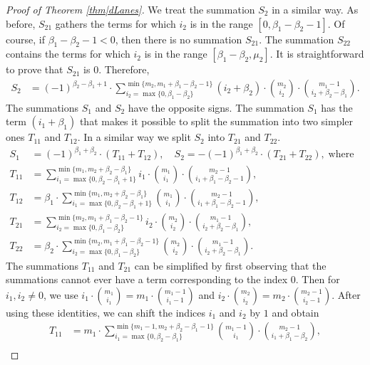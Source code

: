\documentclass[reqno]{amsart}
\begin{document}
\begin{appendix}
\begin{proof}[Proof of Theorem \ref{thm|dLanes}]
We treat the summation $S_2$ in a similar way. As before, $S_{21}$ gathers the terms for which $i_2$ is in the range $[0, \beta_1-\beta_2-1]$. Of course, if $\beta_1-\beta_2-1<0$, then there is no summation $S_{21}$. The summation $S_{22}$ contains the terms for which $i_2$ is in the range $[\beta_1-\beta_2,\mu_2]$. It is straightforward to prove that $S_{21}$ is $0$. Therefore,  
\begin{align}S_2&=(-1)^{\beta_2-\beta_1+1}\cdot\sum_{i_2=\max\{0,\beta_1-\beta_2\}}^{\min\{m_2,m_1+\beta_1-\beta_2-1\}}  (i_2+\beta_2)\cdot 
\binom{m_2}{i_2}\cdot
 \binom{m_1-1}{i_2+\beta_2-\beta_1} . \label{eqn|S22}
\end{align}
The summations $S_1$ and $S_2$ have the opposite signs.  The summation $S_1$ has the term $(i_1+\beta_1)$ that makes it possible to split the summation into two simpler ones $T_{11}$ and $T_{12}$. In a similar way we split $S_2$ into $T_{21}$ and $T_{22}$. 
\begin{align}
S_1&=(-1)^{\beta_1+\beta_2}\cdot (T_{11}+T_{12}), \quad
S_2=-(-1)^{\beta_1+\beta_2}\cdot (T_{21}+T_{22}), \;\mbox{where}\quad \label{eqn|sumSplitting} \\
T_{11}&= \sum_{i_1=\max\{0,\beta_2-\beta_1+1\}}^{\min\{m_1,m_2+\beta_2-\beta_1\}} i_1\cdot \binom{m_1}{i_1}\cdot  \binom{m_2-1}{i_1+\beta_1-\beta_2-1},\label{eqn|T11B}\\
T_{12}&=\beta_1\cdot\sum_{i_1=\max\{0,\beta_2-\beta_1+1\}}^{\min\{m_1,m_2+\beta_2-\beta_1\}}   \binom{m_1}{i_1}\cdot  \binom{m_2-1}{i_1+\beta_1-\beta_2-1},\label{eqn|T12}\\
T_{21}&=\sum_{i_2=\max\{0,\beta_1-\beta_2\}}^{\min\{m_2,m_1+\beta_1-\beta_2-1\}}  i_2\cdot 
\binom{m_2}{i_2}\cdot
 \binom{m_1-1}{i_2+\beta_2-\beta_1}, \label{eqn|T21B}\\
 T_{22}&=\beta_2\cdot\sum_{i_2=\max\{0,\beta_1-\beta_2\}}^{\min\{m_2,m_1+\beta_1-\beta_2-1\}}  
\binom{m_2}{i_2}\cdot
 \binom{m_1-1}{i_2+\beta_2-\beta_1}.\label{eqn|T22}
\end{align}
The summations $T_{11}$ and $T_{21}$ can be simplified by first observing that the summations cannot ever have a term corresponding to the index $0$. Then for $i_1,i_2\neq 0$, we use $i_1\cdot \binom{m_1}{i_1}=m_1\cdot\binom{m_1-1}{i_1-1}$ and $i_2\cdot \binom{m_2}{i_2}=m_2\cdot\binom{m_2-1}{i_2-1}$. After using these identities, we can shift the indices $i_1$ and $i_2$ by $1$ and obtain 
\begin{align}
T_{11}&= m_1\cdot\sum_{i_1=\max\{0,\beta_2-\beta_1\}}^{\min\{m_1-1,m_2+\beta_2-\beta_1-1\}}  \binom{m_1-1}{i_1}\cdot  \binom{m_2-1}{i_1+\beta_1-\beta_2},\label{eqn|T11}\\

\end{align}
\end{proof}
\end{appendix}
\end{document}

